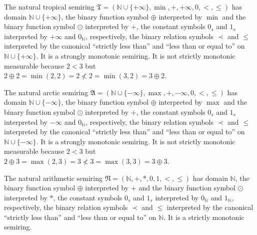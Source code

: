 \begin{example}
    The natural tropical semiring $\mathfrak{T} = (\mathbb{N} \cup \{+\infty\},\min,+,+\infty, 0, <, \leq)$ has domain $\mathbb{N} \cup \{+\infty\}$, the binary function symbol $\oplus$ interpreted by $\min$ and the binary function symbol $\odot$ interpreted by $+$, the constant symbols $0_s$ and $1_s$ interpreted by $+\infty$ and $0_\mathbb{N}$, respectively, the binary relation symbols $\prec$ and $\leq$ interpreted by the canonical \enquote{strictly less than} and \enquote{less than or equal to} on $\mathbb{N} \cup \{+\infty\}$. It is a strongly monotonic semiring. It is not strictly monotonic measurable because $2 < 3$ but $2 \oplus 2 = \min(2,2) = 2 \not < 2 = \min(3,2) = 3 \oplus 2$.
\end{example}
    
\begin{example}
    The natural arctic semiring $\mathfrak{A} = (\mathbb{N} \cup \{-\infty\},\max,+,-\infty, 0,<,\leq)$ has domain $\mathbb{N} \cup \{-\infty\}$, the binary function symbol $\oplus$ interpreted by $\max$ and the binary function symbol $\odot$ interpreted by $+$, the constant symbols $0_s$ and $1_s$ interpreted by $-\infty$ and $0_\mathbb{N}$, respectively, the binary relation symbols $\prec$ and $\leq$ interpreted by the canonical \enquote{strictly less than} and \enquote{less than or equal to} on $\mathbb{N} \cup \{-\infty\}$. It is a strongly monotonic semiring. It is not strictly monotonic measurable because $2 < 3$ but $2 \oplus 3 = \max(2,3) = 3 \not < 3 = \max(3,3) = 3 \oplus 3$.
\end{example}

\begin{example}
    The natural arithmetic semiring $\mathfrak{N} = (\mathbb{N},+,*,0,1,<,\leq)$ has domain $\mathbb{N}$, the binary function symbol $\oplus$ interpreted by $+$ and the binary function symbol $\odot$ interpreted by $*$, the constant symbols $0_s$ and $1_s$ interpreted by $0_\mathbb{N}$ and $1_\mathbb{N}$, respectively, the binary relation symbols $\prec$ and $\leq$ interpreted by the canonical \enquote{strictly less than} and \enquote{less than or equal to} on $\mathbb{N}$. It is a strictly monotonic semiring.
\end{example}


